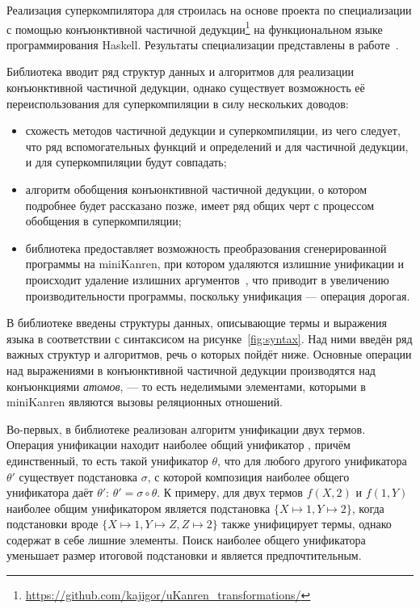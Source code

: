 Реализация суперкомпилятора для \ukanren строилась на основе проекта по специализации \ukanren с помощью конъюнктивной частичной
дедукции\footnote{\url{https://github.com/kajigor/uKanren_transformations/}} на функциональном языке программирования Haskell.
Результаты специализации \ukanren представлены в работе~\cite{lozov}.

Библиотека вводит ряд структур данных и алгоритмов для реализации конъюнктивной частичной дедукции,
однако существует возможность её переиспользования для суперкомпиляции в силу нескольких доводов:
\begin{itemize}
\item схожесть методов частичной дедукции и суперкомпиляции\cite{pdAndDriving},
      из чего следует, что ряд вспомогательных функций и определений и для частичной дедукции, и для суперкомпиляции
      будут совпадать;
\item алгоритм обобщения конъюнктивной частичной дедукции\cite{cpd}, о котором подробнее будет рассказано позже,
      имеет ряд общих черт с процессом обобщения в суперкомпиляции;
\item библиотека предоставляет возможность преобразования сгенерированной программы
      на miniKanren, при котором удаляются излишние унификации и
      происходит удаление излишних аргументов~,
      что приводит в увеличению производительности программы, поскольку унификация --- операция дорогая.
\end{itemize}

В библиотеке введены структуры данных, описывающие термы и выражения языка
в соответствии с синтаксисом \ukanren на рисунке~\ref{fig:syntax}.
Над ними введён ряд важных структур и алгоритмов, речь о которых пойдёт ниже.
Основные операции над выражениями в конъюнктивной частичной дедукции производятся над конъюнкциями
\emph{атомов}, --- то есть неделимыми элементами, которыми в miniKanren являются
вызовы реляционных отношений.


Во-первых, в библиотеке реализован алгоритм унификации двух термов.
Операция унификации находит наиболее общий унификатор ,
причём единственный, то есть такой
унификатор $\theta$, что для любого другого унификатора $\theta'$ существует подстановка $\sigma$,
с которой композиция наиболее общего унификатора даёт $\theta'$: $\theta' = \sigma \circ \theta$\cite{unification}.
К примеру, для двух термов $f(X, 2)$ и $f(1, Y)$ наиболее общим унификатором является
подстановка $\{ X \mapsto 1, Y \mapsto 2 \}$, когда подстановки вроде
$\{ X \mapsto 1, Y \mapsto Z, Z \mapsto 2 \}$ также унифицирует термы, однако
содержат в себе лишние элементы. 
Поиск наиболее общего унификатора уменьшает размер итоговой подстановки и является предпочтительным.

